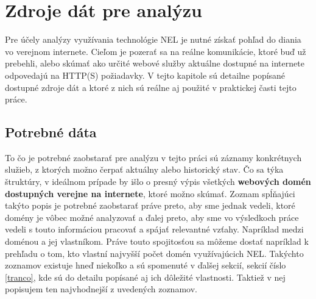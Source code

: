 \chapter{Zdroje dát pre analýzu}
\label{data-sources-available-for-research}

Pre účely analýzy využívania technológie NEL je nutné získať pohľad do diania vo verejnom internete.
Cieľom je pozerať sa na reálne komunikácie, ktoré buď už prebehli, alebo skúmať ako určité webové služby aktuálne dostupné na internete
odpovedajú na HTTP(S) požiadavky. V tejto kapitole sú detailne popísané dostupné zdroje dát 
a ktoré z nich sú reálne aj použité v praktickej časti tejto práce. %

\section{Potrebné dáta}

To čo je potrebné zaobstarať pre analýzu v tejto práci sú záznamy konkrétnych služieb, z ktorých možno čerpať aktuálny alebo historický stav. Čo sa týka štruktúry, v ideálnom prípade by išlo o presný výpis všetkých \textbf{webových domén dostupných verejne na internete}, ktoré možno skúmať. 
Zoznam spĺňajúci takýto popis je potrebné zaobstarať práve preto, aby sme jednak vedeli, ktoré domény je vôbec možné analyzovať a ďalej preto, aby sme vo výsledkoch práce vedeli s touto informáciou pracovať a spájať relevantné vzťahy. Napríklad medzi doménou a jej vlastníkom. 
Práve touto spojitosťou sa môžeme dostať napríklad k prehľadu o tom, kto vlastní najvyšší počet domén využívajúcich NEL. 
Takýchto zoznamov existuje hneď niekoľko a sú spomenuté v ďalšej sekcií, sekcií číslo \ref{tranco}, kde sú do detailu popísané aj ich dôležité vlastnosti. 
Taktiež v nej popisujem ten najvhodnejší z uvedených zoznamov.

